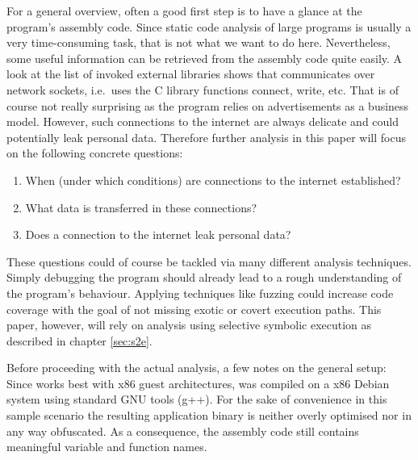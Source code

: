 \bigskip
For a general overview, often a good first step is to have a glance at the program's assembly code.
Since static code analysis of large programs is usually a very time-consuming task, that is not what we want to do here.
Nevertheless, some useful information can be retrieved from the assembly code quite easily.
A look at the list of invoked external libraries shows that \app communicates over network sockets, i.e.~uses the C library functions connect, write, etc.
That is of course not really surprising as the program relies on advertisements as a business model.
However, such connections to the internet are always delicate and could potentially leak personal data.
Therefore further analysis in this paper will focus on the following concrete questions:
\begin{enumerate}
  \item When (under which conditions) are connections to the internet established?
  \item What data is transferred in these connections?
  \item Does a connection to the internet leak personal data?
\end{enumerate}
These questions could of course be tackled via many different analysis techniques.
Simply debugging the program should already lead to a rough understanding of the program's behaviour.
Applying techniques like fuzzing could increase code coverage with the goal of not missing exotic or covert execution paths.
This paper, however, will rely on analysis using selective symbolic execution as described in chapter \ref{sec:s2e}.

\bigskip

Before proceeding with the actual analysis, a few notes on the general setup: 
Since \sse works best with x86 guest architectures, \app was compiled on a x86 Debian system using standard GNU tools (g++).
For the sake of convenience in this sample scenario the resulting application binary is neither overly optimised nor in any way obfuscated.
As a consequence, the assembly code still contains meaningful variable and function names.


\iffalse
§4	Project idea: explore privacy issues in a sample binary
		> Plan darlegen: Programme könnten unerwünscht Infos preisgeben.
		> Daher: Eigenes kleines Programm, das … macht.
\fi